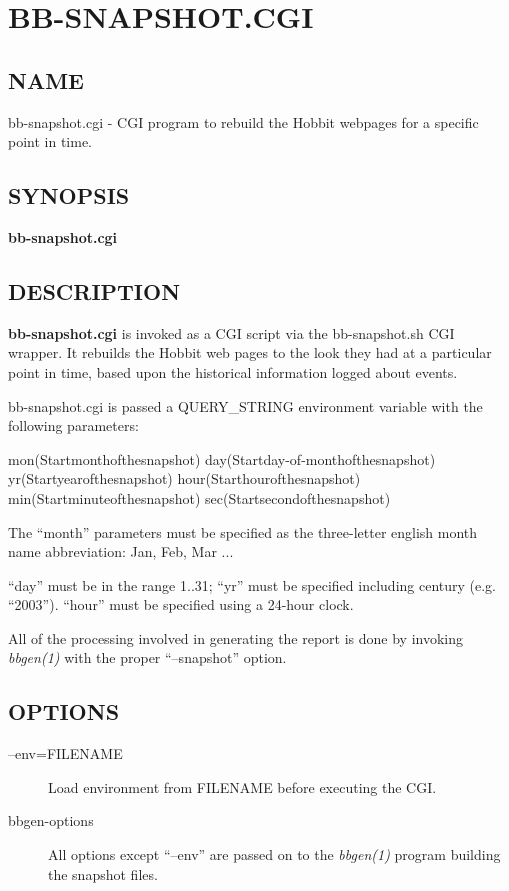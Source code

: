  
%
\newpage
\section{BB-SNAPSHOT.CGI}
\subsection{NAME}
 bb-snapshot.cgi - CGI program to rebuild the Hobbit webpages for a
 specific point in time. 
\subsection{SYNOPSIS}

\textbf{bb-snapshot.cgi}


 
\subsection{DESCRIPTION}
\textbf{bb-snapshot.cgi} is invoked as a CGI script via the
bb-snapshot.sh CGI wrapper. It rebuilds the Hobbit web pages to the
look they had at a particular point in time, based upon the historical
information logged about events. 


 bb-snapshot.cgi is passed a QUERY\_STRING environment variable with the following parameters: 


  
mon(Startmonthofthesnapshot)  
day(Startday-of-monthofthesnapshot)  
yr(Startyearofthesnapshot)  
hour(Starthourofthesnapshot)  
min(Startminuteofthesnapshot)  
sec(Startsecondofthesnapshot) 


  The ``month'' parameters must be specified as the three-letter
  english month name abbreviation: Jan, Feb, Mar ... 



  ``day'' must be in the range 1..31; ``yr'' must be specified
  including century (e.g. ``2003''). ``hour'' must be specified using
  a 24-hour clock. 



  All of the processing involved in generating the report is done by
  invoking \emph{bbgen(1)} with the proper ``--snapshot'' option. 


 
\subsection{OPTIONS}
\begin{description}
\item[--env=FILENAME] Load environment from FILENAME before executing the CGI. 

 

\item[bbgen-options] All options except ``--env'' are passed on to the \emph{bbgen(1)}
 program building the snapshot files. 

 


\end{description}


